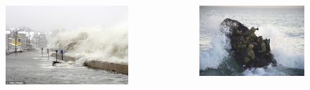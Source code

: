 \documentclass[7pt]{beamer}
\begin{document}
\begin{frame}
\begin{columns}
\begin{figure}[h]
\includegraphics[width=.90\linewidth]{img/C_Flood.jpg}\hfill
\end{figure}
\begin{figure}[h]
\includegraphics[width=.90\linewidth]{img/Navy_S.jpg}
\end{figure}


\end{columns}

\end{frame}

\end{document}
